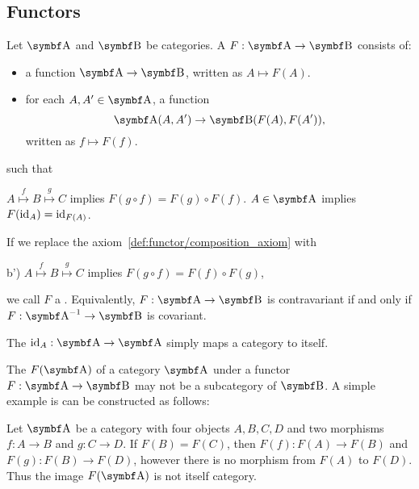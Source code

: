 \subsection{Functors}\label{subsec:functors}

\begin{definition}\label{def:functor}\cite[definitions 1.2.1, 1.2.10]{Leinster2014}
  Let \( \Bold A \) and \( \Bold B \) be categories. A  \( F: \Bold A \to \Bold B \) consists of:
  \begin{itemize}
    \item a function \( \Bold A \to \Bold B \), written as \( A \mapsto F(A) \).
    \item for each \( A, A' \in \Bold A \), a function
    \begin{equation*}
      \Cat{A}(A, A') \to \Bold{B}(F(A), F(A')),
    \end{equation*}
    written as \( f \mapsto F(f) \).
  \end{itemize}
  such that
  \begin{defenum}
     \( A \overset f \mapsto B \overset g \mapsto C \) implies \( F(g \circ f) = F(g) \circ F(f) \).
     \( A \in \Bold A \) implies \( F(\operatorname{id}_A) = \operatorname{id}_{F(A)} \).
  \end{defenum}

  If we replace the axiom~\cref{def:functor/composition_axiom} with
  \begin{defenum}
    \item[b')]\label{def:functor/contravariant_composition_axiom} \( A \overset f \mapsto B \overset g \mapsto C \) implies \( F(g \circ f) = F(f) \circ F(g) \),
  \end{defenum}
  we call \( F \) a . Equivalently, \( F: \Bold A \to \Bold B \) is contravariant if and only if \( F: \Cat{A}^{-1} \to \Bold B \) is covariant.

  The  \( \Id_A: \Bold A \to \Bold A \) simply maps a category to itself.
\end{definition}

\begin{remark}\label{remark:image_of_functor_maybe_not_subcategory}
  The  \( F(\Bold A) \) of a category \( \Bold A \) under a functor \( F: \Bold A \to \Bold B \) may not be a subcategory of \( \Bold B \). A simple example is can be constructed as follows:

  Let \( \Bold A \) be a category with four objects \( A, B, C, D \) and two morphisms \( f: A \to B \) and \( g: C \to D \). If \( F(B) = F(C) \), then \( F(f): F(A) \to F(B) \) and \( F(g): F(B) \to F(D) \), however there is no morphism from \( F(A) \) to \( F(D) \). Thus the image \( F(\Bold A) \) is not itself category.
\end{remark}

